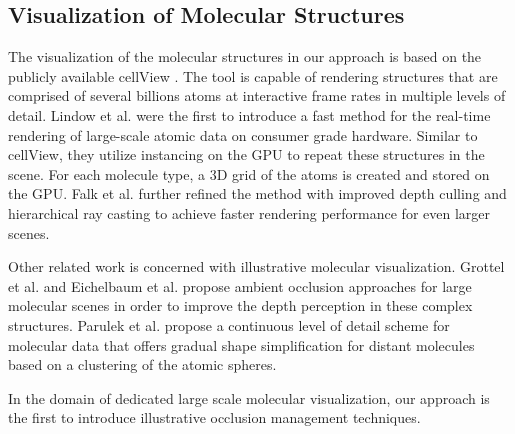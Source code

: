 \subsection{Visualization of Molecular Structures}
The visualization of the molecular structures in our approach is based on the publicly available cellView \cite{muzic15}. The tool is capable of rendering structures that are comprised of several billions atoms at interactive frame rates in multiple levels of detail.  
Lindow et al. \cite{lindow15} were the ﬁrst to introduce a fast method for the real-time rendering of large-scale atomic data on consumer grade hardware. Similar to cellView, they utilize instancing on the GPU to repeat these structures in the scene. For each molecule type, a 3D grid of the atoms is created and stored on the GPU. Falk et al. \cite{falk13} further refined the method with improved depth culling and hierarchical ray casting to achieve faster rendering performance for even larger scenes. 

Other related work is concerned with illustrative molecular visualization. Grottel et al. \cite{grottel12} and Eichelbaum et al. \cite{eichelbaum13} propose ambient occlusion approaches for large molecular scenes in order to improve the depth perception in these complex structures. Parulek et al. \cite{parulek14} propose a continuous level of detail scheme for molecular data that offers gradual shape simplification for distant molecules based on a clustering of the atomic spheres.

In the domain of dedicated large scale molecular visualization, our approach is the first to introduce illustrative occlusion management techniques.
